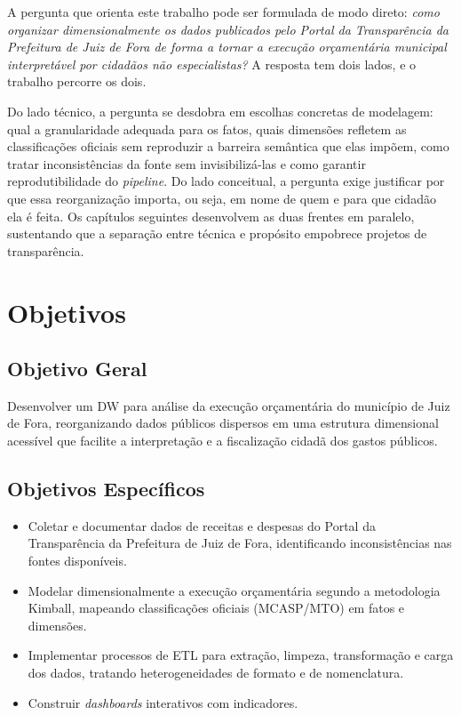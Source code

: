 A pergunta que orienta este trabalho pode ser formulada de modo direto: \textit{como organizar dimensionalmente os dados publicados pelo Portal da Transparência da Prefeitura de Juiz de Fora de forma a tornar a execução orçamentária municipal interpretável por cidadãos não especialistas?} A resposta tem dois lados, e o trabalho percorre os dois.

Do lado técnico, a pergunta se desdobra em escolhas concretas de modelagem: qual a granularidade adequada para os fatos, quais dimensões refletem as classificações oficiais sem reproduzir a barreira semântica que elas impõem, como tratar inconsistências da fonte sem invisibilizá-las e como garantir reprodutibilidade do \textit{pipeline}. Do lado conceitual, a pergunta exige justificar por que essa reorganização importa, ou seja, em nome de quem e para que cidadão ela é feita. Os capítulos seguintes desenvolvem as duas frentes em paralelo, sustentando que a separação entre técnica e propósito empobrece projetos de transparência.

\section{Objetivos}

\subsection*{Objetivo Geral}

Desenvolver um DW para análise da execução orçamentária do município de Juiz de Fora, reorganizando dados públicos dispersos em uma estrutura dimensional acessível que facilite a interpretação e a fiscalização cidadã dos gastos públicos.

\subsection*{Objetivos Específicos}

\begin{itemize}
    \item Coletar e documentar dados de receitas e despesas do Portal da Transparência da Prefeitura de Juiz de Fora, identificando inconsistências nas fontes disponíveis.
    \item Modelar dimensionalmente a execução orçamentária segundo a metodologia Kimball, mapeando classificações oficiais (MCASP/MTO) em fatos e dimensões.
    \item Implementar processos de ETL para extração, limpeza, transformação e carga dos dados, tratando heterogeneidades de formato e de nomenclatura.
    \item Construir \textit{dashboards} interativos com indicadores.
\end{itemize}

